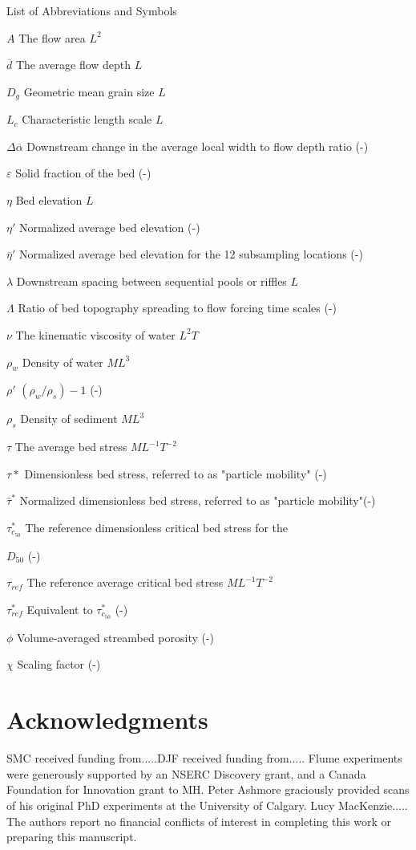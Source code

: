 \documentclass[12pt]{article}
\begin{document}
\begin{description}
\item[] List of Abbreviations and Symbols
\item{$A$} The flow area $L^2$
\item{$\overline{d}$} The average flow depth $L$
\item{$D_g$} Geometric mean grain size $L$
\item{$L_c$} Characteristic length scale $L$
\item{$\Delta\overline{\alpha}$} Downstream change in the average local width to flow depth ratio (-)
\item{$\varepsilon$} Solid fraction of the bed (-)
\item{$\eta$} Bed elevation $L$
\item{$\eta'$} Normalized average bed elevation (-)
\item{$\overline{\eta}'$} Normalized average bed elevation for the 12 subsampling locations (-)
\item{$\lambda$} Downstream spacing between sequential pools or riffles $L$
\item{$\varLambda$} Ratio of bed topography spreading to flow forcing time scales (-)
\item{$\nu$} The kinematic viscosity of water $L^2T$
\item{$\rho_w$} Density of water $ML^3$
\item{$\rho'$} $(\rho_w/\rho_s)-1$ (-)
\item{$\rho_s$} Density of sediment $ML^3$
\item{$\tau$} The average bed stress $ML^{-1}T^{-2}$
\item{$\tau*$} Dimensionless bed stress, referred to as "particle mobility" (-)
\item{$\hat{\tau}^*$} Normalized dimensionless bed stress, referred to as "particle mobility"(-) \item{$\tau_{c_{50}}^*$} The reference dimensionless critical bed stress for the 
\item{$D_{50}$} (-)
\item{$\tau_{ref}$} The reference average critical bed stress $ML^{-1}T^{-2}$
\item{$\tau_{ref}^*$} Equivalent to $\tau_{c_{50}}^*$ (-)
\item{$\phi$} Volume-averaged streambed porosity (-)
\item{$\chi$} Scaling factor (-)
\label{Ch3_tabnot}
\end{description}
%
\section{Acknowledgments}
SMC received funding from.....DJF received funding from..... Flume experiments were generously supported by an NSERC Discovery grant, and a Canada Foundation for Innovation grant to MH. Peter Ashmore graciously provided scans of his original PhD experiments at the University of Calgary. Lucy MacKenzie..... The authors report no financial conflicts of interest in completing this work or preparing this manuscript.\par 


\end{document}
